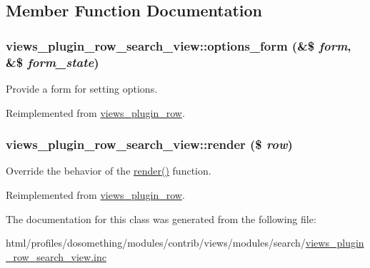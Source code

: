 \subsection{Member Function Documentation}
\hypertarget{classviews__plugin__row__search__view_a2d2e479f414c487aff3d88343274b49b}{
\subsubsection[{options\_\-form}]{\setlength{\rightskip}{0pt plus 5cm}views\_\-plugin\_\-row\_\-search\_\-view::options\_\-form (\&\$ {\em form}, \/  \&\$ {\em form\_\-state})}}
\label{classviews__plugin__row__search__view_a2d2e479f414c487aff3d88343274b49b}
Provide a form for setting options. 

Reimplemented from \hyperlink{classviews__plugin__row_a6914c39d64977a0aa71da39cc1af004e}{views\_\-plugin\_\-row}.\hypertarget{classviews__plugin__row__search__view_aec0c01f2e90075589b38f73381aa4ce7}{
\subsubsection[{render}]{\setlength{\rightskip}{0pt plus 5cm}views\_\-plugin\_\-row\_\-search\_\-view::render (\$ {\em row})}}
\label{classviews__plugin__row__search__view_aec0c01f2e90075589b38f73381aa4ce7}
Override the behavior of the \hyperlink{classviews__plugin__row__search__view_aec0c01f2e90075589b38f73381aa4ce7}{render()} function. 

Reimplemented from \hyperlink{classviews__plugin__row_a8243842e087dd28664b32cef0309f2a6}{views\_\-plugin\_\-row}.

The documentation for this class was generated from the following file:\begin{DoxyCompactItemize}
\item 
html/profiles/dosomething/modules/contrib/views/modules/search/\hyperlink{views__plugin__row__search__view_8inc}{views\_\-plugin\_\-row\_\-search\_\-view.inc}\end{DoxyCompactItemize}
